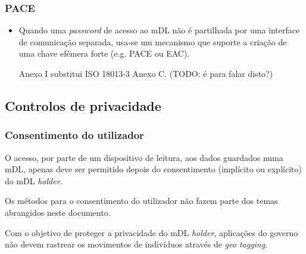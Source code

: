 \subsubsection{PACE}
\label{sec:org54755e3}
\begin{itemize}
\item Quando uma \emph{password} de acesso ao mDL não é partilhada por uma interface
de comunicação separada, usa-se um mecanismo que suporte a criação de uma
chave efémera forte (e.g. PACE ou EAC).

Anexo I substitui ISO 18013-3 Anexo C.
(TODO: é para falar disto?)
\end{itemize}

\subsection{Controlos de privacidade}
\label{sec:org1279156}
\subsubsection{Consentimento do utilizador}
\label{sec:orga2915d6}
O acesso, por parte de um dispositivo de leitura, aos dados guardados numa
mDL, apenas deve ser permitido depois do consentimento (implícito ou
explícito) do mDL \emph{holder}.

Os métodos para o consentimento do utilizador não fazem parte dos temas
abrangidos neste documento.

Com o objetivo de proteger a privacidade do mDL \emph{holder}, aplicações do
governo não devem rastrear os movimentos de indivíduos através de \emph{geo
tagging}.

